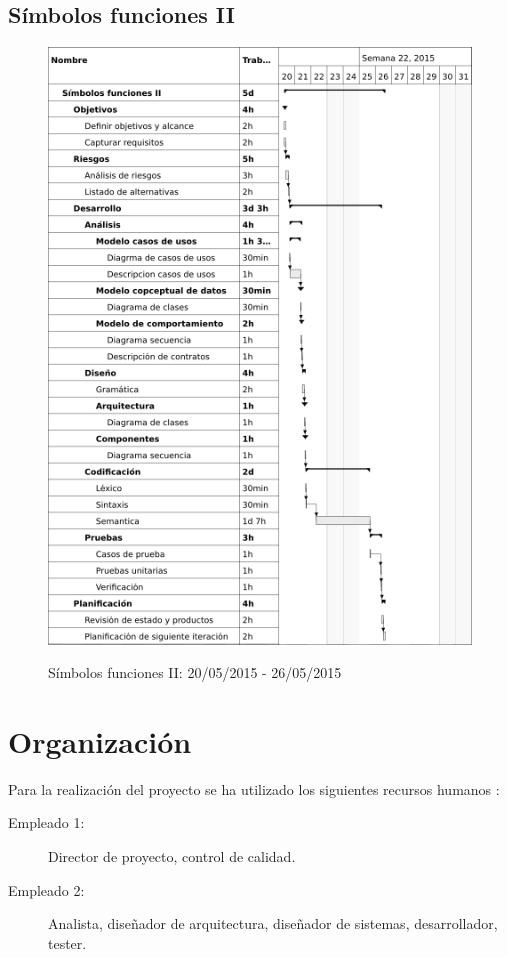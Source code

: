 \subsection{Símbolos funciones II}
\begin{center}
\begin{figure}[H]
\centering
\includegraphics[scale=1]{planning/29-simbolos-funciones-ii.png} \\
\caption{Símbolos funciones II: 20/05/2015 - 26/05/2015 }
\end{figure}
\end{center}


\section{Organización}
Para la realización del proyecto se ha utilizado los siguientes recursos humanos :
\begin{description}
\item[Empleado 1:] Director de proyecto, control de calidad. 
\item[Empleado 2:] Analista, diseñador de arquitectura, diseñador de sistemas, desarrollador, tester.
\end{description}


